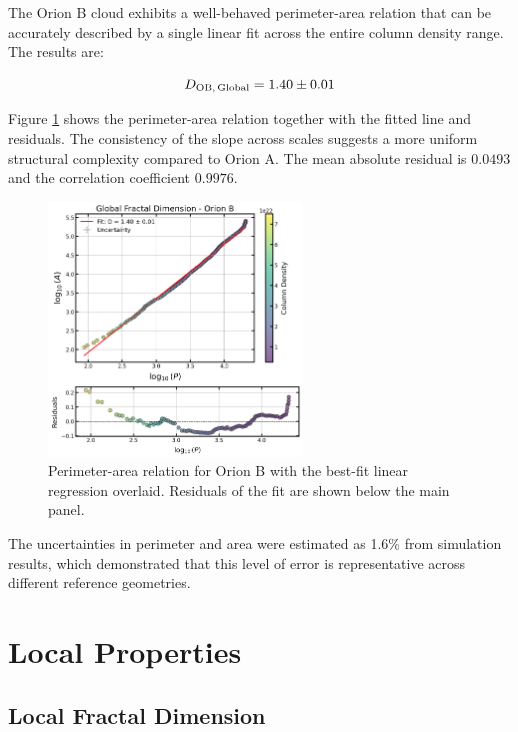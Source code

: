 The Orion B cloud exhibits a well-behaved perimeter-area relation that can be accurately described by a single linear fit across the entire column density range. The results are:

\begin{equation}
    \notag
    D_{\mathrm{OB,\,Global}} = 1.40 \pm 0.01
\end{equation}

Figure \ref{fig:orion_B_global} shows the perimeter-area relation together with the fitted line and residuals. The consistency of the slope across scales suggests a more uniform structural complexity compared to Orion A. The mean absolute residual is $0.0493$ and the correlation coefficient $0.9976$.

\begin{figure}[t]
    \centering
    \includegraphics[width=0.6\textwidth]{figures/orion_B_global.png}
    \caption{Perimeter-area relation for Orion B with the best-fit linear regression overlaid. Residuals of the fit are shown below the main panel.}
    \label{fig:orion_B_global}
\end{figure}

The uncertainties in perimeter and area were estimated as 1.6\% from simulation results, which demonstrated that this level of error is representative across different reference geometries.

\section{Local Properties}

\subsection{Local Fractal Dimension}

